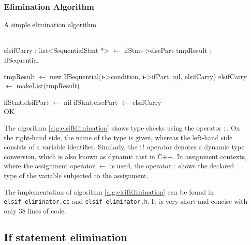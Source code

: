 \subsubsection{Elimination Algorithm}
\begin{algorithm}
    \caption{A simple  elimination algorithm}
    \label{alg:elsifElimination}
    \begin{algorithmic}[1]
        \State {}
        \EndIf
        \EndFor
        \\
        \State elsifCarry : list<SequentialStmt *> \(\gets\) ifStmt->elsePart
        \State tmpResult : IfSequential

        \State tmpResult \(\gets\) new IfSequential(i->condition,
        i->ifPart, nil, elsifCarry)
        \State elsifCarry \(\gets\) makeList(tmpResult)
        \EndFor

        \State ifStmt.elsifPart \(\gets\) nil
        \State ifStmt.elsePart \(\gets\) elsifCarry
        \\
        \State \Return OK
        \EndFunction
    \end{algorithmic}
\end{algorithm}
\noindent{}The algorithm \ref{alg:elsifElimination} shows type checks using the
operator \(:\). On the right-hand side, the name of the type is given,
whereas the left-hand side consists of a variable
identifier. Similarly, the \(:!\) operator denotes a dynamic type
conversion, which is also known as dynamic cast in C++. In assignment
contexts, where the assignment operator \(\gets\) is used, the
operator \(:\) shows the declared type of the variable subjected to
the assignment.

The implementation of algorithm \ref{alg:elsifElimination} can be
found in \texttt{elsif_eliminator.cc} and
\texttt{elsif_eliminator.h}. It is very short and concise with only 38
lines of code.
%
\subsection{If statement elimination}
\label{sec:ifStatementElimination}

